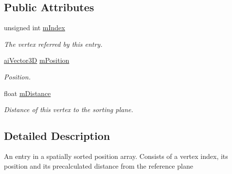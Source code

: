 \subsection*{Public Attributes}
\begin{DoxyCompactItemize}
\item 
\hypertarget{struct_assimp_1_1_spatial_sort_1_1_entry_aa565c52287969319573aa49b7e57e8b4}{unsigned int \hyperlink{struct_assimp_1_1_spatial_sort_1_1_entry_aa565c52287969319573aa49b7e57e8b4}{m\+Index}}\label{struct_assimp_1_1_spatial_sort_1_1_entry_aa565c52287969319573aa49b7e57e8b4}

\begin{DoxyCompactList}\small\item\em The vertex referred by this entry. \end{DoxyCompactList}\item 
\hypertarget{struct_assimp_1_1_spatial_sort_1_1_entry_a926cd396d1a79007bb7e3807ec4039d2}{\hyperlink{structai_vector3_d}{ai\+Vector3\+D} \hyperlink{struct_assimp_1_1_spatial_sort_1_1_entry_a926cd396d1a79007bb7e3807ec4039d2}{m\+Position}}\label{struct_assimp_1_1_spatial_sort_1_1_entry_a926cd396d1a79007bb7e3807ec4039d2}

\begin{DoxyCompactList}\small\item\em Position. \end{DoxyCompactList}\item 
\hypertarget{struct_assimp_1_1_spatial_sort_1_1_entry_ac84646b3354c70733652d149d58c44e6}{float \hyperlink{struct_assimp_1_1_spatial_sort_1_1_entry_ac84646b3354c70733652d149d58c44e6}{m\+Distance}}\label{struct_assimp_1_1_spatial_sort_1_1_entry_ac84646b3354c70733652d149d58c44e6}

\begin{DoxyCompactList}\small\item\em Distance of this vertex to the sorting plane. \end{DoxyCompactList}\end{DoxyCompactItemize}


\subsection{Detailed Description}
An entry in a spatially sorted position array. Consists of a vertex index, its position and its precalculated distance from the reference plane 

